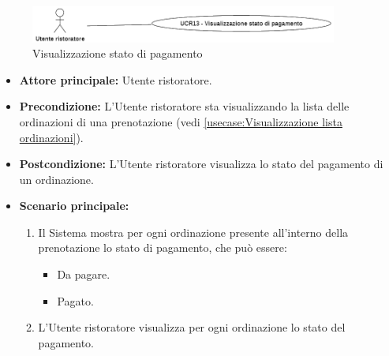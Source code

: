 \label{usecase:Visualizzazione stato di pagamento}

\begin{figure}[h]
	\centering
	\includegraphics[width=0.9\textwidth]{./uml/UCR13.png} 
	\caption{Visualizzazione stato di pagamento}
	\label{fig:UCR13}
  \end{figure}

\begin{itemize}
	
    \item \textbf{Attore principale:} Utente ristoratore.

	\item \textbf{Precondizione:} L'Utente ristoratore sta visualizzando la lista delle ordinazioni di una prenotazione (vedi \autoref{usecase:Visualizzazione lista ordinazioni}).

	\item \textbf{Postcondizione:} L'Utente ristoratore visualizza lo stato del pagamento di un ordinazione.

	\item \textbf{Scenario principale:}
	\begin{enumerate}
		\item Il Sistema mostra per ogni ordinazione presente all'interno della prenotazione lo stato di pagamento, che può essere:
        \begin{itemize}
            \item Da pagare.
            \item Pagato.
        \end{itemize}
        \item L'Utente ristoratore visualizza per ogni ordinazione lo stato del pagamento.
	\end{enumerate}

\end{itemize}